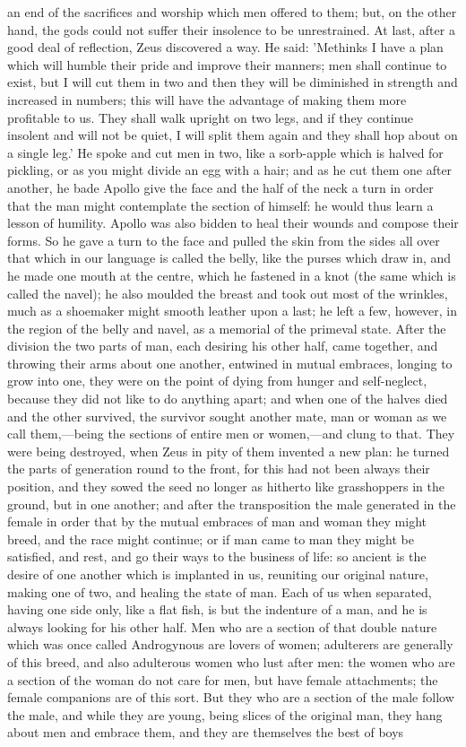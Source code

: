an end of the sacrifices and worship which men offered to them; but, on the other hand, the gods could not suffer their insolence to be unrestrained. At last, after a good deal of reflection, Zeus discovered a way. He said: 'Methinks I have a plan which will humble their pride and improve their manners; men shall continue to exist, but I will cut them in two and then they will be diminished in strength and increased in numbers; this will have the advantage of making them more profitable to us. They shall walk upright on two legs, and if they continue insolent and will not be quiet, I will split them again and they shall hop about on a single leg.' He spoke and cut men in two, like a sorb-apple which is halved for pickling, or as you might divide an egg with a hair; and as he cut them one after another, he bade Apollo give the face and the half of the neck a turn in order that the man might contemplate the section of himself: he would thus learn a lesson of humility. Apollo was also bidden to heal their wounds and compose their forms. So he gave a turn to the face and pulled the skin from the sides all over that which in our language is called the belly, like the purses which draw in, and he made one mouth at the centre, which he fastened in a knot (the same which is called the navel); he also moulded the breast and took out most of the wrinkles, much as a shoemaker might smooth leather upon a last; he left a few, however, in the region of the belly and navel, as a memorial of the primeval state. After the division the two parts of man, each desiring his other half, came together, and throwing their arms about one another, entwined in mutual embraces, longing to grow into one, they were on the point of dying from hunger and self-neglect, because they did not like to do anything apart; and when one of the halves died and the other survived, the survivor sought another mate, man or woman as we call them,---being the sections of entire men or women,---and clung to that. They were being destroyed, when Zeus in pity of them invented a new plan: he turned the parts of generation round to the front, for this had not been always their position, and they sowed the seed no longer as hitherto like grasshoppers in the ground, but in one another; and after the transposition the male generated in the female in order that by the mutual embraces of man and woman they might breed, and the race might continue; or if man came to man they might be satisfied, and rest, and go their ways to the business of life: so ancient is the desire of one another which is implanted in us, reuniting our original nature, making one of two, and healing the state of man. Each of us when separated, having one side only, like a flat fish, is but the indenture of a man, and he is always looking for his other half. Men who are a section of that double nature which was once called Androgynous are lovers of women; adulterers are generally of this breed, and also adulterous women who lust after men: the women who are a section of the woman do not care for men, but have female attachments; the female companions are of this sort. But they who are a section of the male follow the male, and while they are young, being slices of the original man, they hang about men and embrace them, and they are themselves the best of boys 
